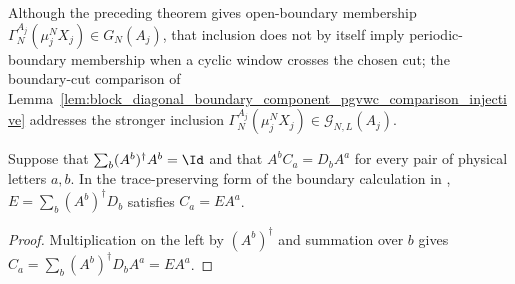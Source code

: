 Although the preceding theorem gives open-boundary membership
$\Gamma_N^{A_j}(\mu_j^NX_j)\in G_N(A_j)$, that inclusion does not by itself imply
periodic-boundary membership when a cyclic window crosses the chosen cut; the
boundary-cut comparison of
Lemma~\ref{lem:block_diagonal_boundary_component_pgvwc_comparison_injective}
addresses the stronger inclusion
$\Gamma_N^{A_j}(\mu_j^NX_j)\in\mathcal G_{N,L}(A_j)$.

\begin{lemma}
    \label{thm:ph_tp_boundary_compatibility}
    \leanok
    Suppose that $\sum_b (A^b)^\dagger A^b=\Id$ and that
    $A^b C_a=D_b A^a$ for every pair of physical letters $a,b$.
    In the trace-preserving form of the boundary calculation in
    \cite[Theorem~12]{PerezGarcia2007Matrix}, $E=\sum_b(A^b)^\dagger D_b$
    satisfies $C_a=EA^a$.
\end{lemma}
\begin{proof}
    \leanok
    Multiplication on the left by $(A^b)^\dagger$ and summation over $b$
    gives $C_a=\sum_b(A^b)^\dagger D_b A^a=EA^a$.
\end{proof}

